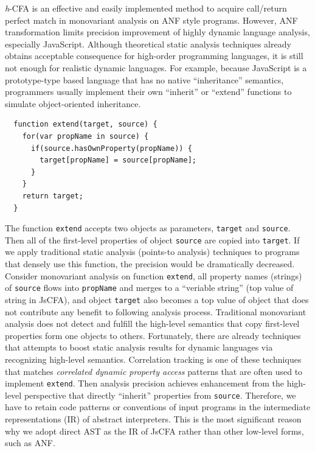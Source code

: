 \documentclass{article}
\begin{document}
\textit{h}-CFA is an effective and easily implemented method to acquire call/return perfect match in monovariant analysis on ANF style programs. However, ANF transformation limits precision improvement of highly dynamic language analysis, especially JavaScript.
Although theoretical static analysis techniques already obtains acceptable consequence for high-order programming languages, it is still not enough for realistic dynamic languages. For example, because JavaScript is a prototype-type based language that has no native ``inheritance'' semantics, programmers usually implement their own ``inherit'' or ``extend'' functions to simulate object-oriented inheritance.
\begin{lstlisting}
  function extend(target, source) {
    for(var propName in source) {
      if(source.hasOwnProperty(propName)) {
        target[propName] = source[propName];
      }
    }
    return target;
  }
\end{lstlisting}
The function \verb|extend| accepts two objects as parameters, \verb|target| and \verb|source|.
Then all of the first-level properties of object \verb|source| are copied into \verb|target|. If we apply traditional static analysis (points-to analysis) techniques to programs that densely use this function, the precision would be dramatically decreased.
Consider monovariant analysis on function \verb|extend|, all property names (strings) of \verb|source| flows into \verb|propName| and merges to a ``veriable string'' (top value of string in JsCFA), and object \verb|target| also becomes a top value of object that does not contribute any benefit to following analysis process.
Traditional monovariant analysis does not detect and fulfill the high-level semantics that copy first-level properties form one objects to others.
Fortunately, there are already techniques that attempts to boost static analysis results for dynamic languages via recognizing high-level semantics.
Correlation tracking %
is one of these techniques that matches \emph{correlated dynamic property access} patterns that are often used to implement \verb|extend|. Then analysis precision achieves enhancement from the high-level perspective that directly ``inherit'' properties from \verb|source|.
Therefore, we have to retain code patterns or conventions of input programs in the intermediate representations (IR) of abstract interpreters.
This is the most significant reason why we adopt direct AST as the IR of JsCFA rather than other low-level forms, such as ANF\@.
\end{document}
